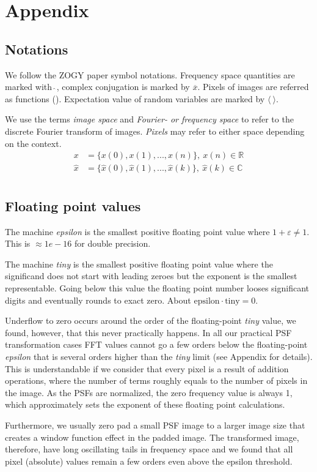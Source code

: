 \section{Appendix\label{sec:appendix}}
\subsection{Notations}
We follow the ZOGY paper symbol notations. Frequency space quantities are
marked with \(\hat{\ }\), complex conjugation is marked by
\(\overline{x}\). Pixels of images are referred as functions
(). Expectation value of random variables are marked by
\(\langle\ \rangle\).
%
\par We use the terms \emph{image space} and \emph{Fourier- or frequency
  space} to refer to the discrete Fourier transform of images. \emph{Pixels}
may refer to either space depending on the context.
\begin{align}
x &= \{x(0), x(1), ... , x(n) \},\ x(n) \in \mathbb{R}\\
\hat{x} &= \{\hat{x}(0), \hat{x}(1), ... , \hat{x}(k) \},\ \hat{x}(k) \in
\mathbb{C}\\
\label{eq:img_func}
\end{align}
%
\subsection{Floating point values\label{sec:floating_point}}
The machine \emph{epsilon} is the smallest positive floating point value
where \(1 + \varepsilon \neq 1\). This is \(\approx 1e-16\) for double
precision.
%
\par The machine \emph{tiny} is the smallest positive floating point value
where the significand does not start with leading zeroes but the exponent is
the smallest representable. Going below this value the floating point number
looses significant digits and eventually rounds to exact zero. About
\(\mathrm{epsilon}\cdot\mathrm{tiny} = 0\).
%
\par Underflow to zero occurs around the order of the floating-point
\emph{tiny} value, we found, however, that this never practically happens. In
all our practical PSF transformation cases FFT values cannot go a few orders
below the floating-point \emph{epsilon} that is several orders higher than
the \emph{tiny} limit (see Appendix for details). This is understandable if
we consider that every pixel is a result of addition operations, where the
number of terms roughly equals to the number of pixels in the image. As the
PSFs are normalized, the zero frequency value is always 1, which
approximately sets the exponent of these floating point calculations.
%
\par Furthermore, we usually zero pad a small PSF image to a larger image
size that creates a window function effect in the padded image. The
transformed image, therefore, have long oscillating tails in frequency space
and we found that all pixel (absolute) values remain a few orders even above
the epsilon threshold.
%
